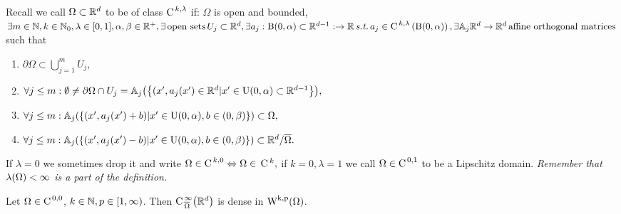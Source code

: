 \documentclass{article}
\begin{document}
\begin{remark}
	Recall we call $\Omega \subset {\mathbb R}^{d}$ to be of class $\text{C}^{\!\,\, k,\lambda}$ if: $\Omega$ is open and bounded, $\exists m \in {\mathbb N}, k \in {\mathbb N}_0, \lambda \in [0,1], \alpha, \beta \in {\mathbb R}^+, \exists \, \text{open sets} \, U_j \subset {\mathbb R}^d, \exists a_j: \text{B}(0,\alpha) \subset {\mathbb R}^{d-1}: \to {\mathbb R} \, \text{\textit{s.t.}} \, a_j \in \text{C}^{\!\, \,k,\lambda}\!\,\left(\text{B}(0,\alpha) \right), \exists \mathbb{A}_j {\mathbb R}^{d} \to {\mathbb R}^{d} \, \text{affine orthogonal matrices} \,$ such that 
	\begin{enumerate}
		\item $\partial \Omega \subset \bigcup_{j=1}^m U_j,$
		\item $\forall j \leq m: \emptyset \neq \partial \Omega \cap U_j = \mathbb{A}_j\qty(\qty{(x',a_j\qty(x') \in \ensuremath{{\mathbb R}}^d | x' \in \text{U}(0,\alpha)\subset \ensuremath{{\mathbb R}}^{d-1}}),$
		\item $\forall j \leq m: \mathbb{A}_j\qty(\qty{(x', a_j(x') + b) | x' \in \text{U}(0,\alpha), b \in (0,\beta)}) \subset \Omega,$
		\item $\forall j \leq m: \mathbb{A}_j\qty(\qty{(x', a_j(x') - b) | x' \in \text{U}(0,\alpha), b \in (0,\beta)}) \subset {\mathbb R}^d/ \overline{\Omega}.$
\end{enumerate}
	If $\lambda = 0$ we sometimes drop it and write $\Omega \in \text{C}^{\!\,\, k,0} \Leftrightarrow \Omega \in \, \text{C} \,^k,$ if $k = 0, \lambda =1$ we call $\Omega \in \text{C}^{\!\,\, 0,1}$ to be a Lipschitz domain.
\textit{Remember that $\lambda\qty(\Omega)<\infty$ is a part of the definition.}

\end{remark}

\begin{theorem}
	Let $\Omega \in \text{C}^{\!\,\, 0,0}$, $k \in {\mathbb N}, p \in [1,\infty)$. Then $\text{C}^{\,\infty}_{\,\overline{\Omega}}\qty({\mathbb R}^d)$ is dense in $\WkpSet{\Omega}$.


\end{theorem}
\end{document}
